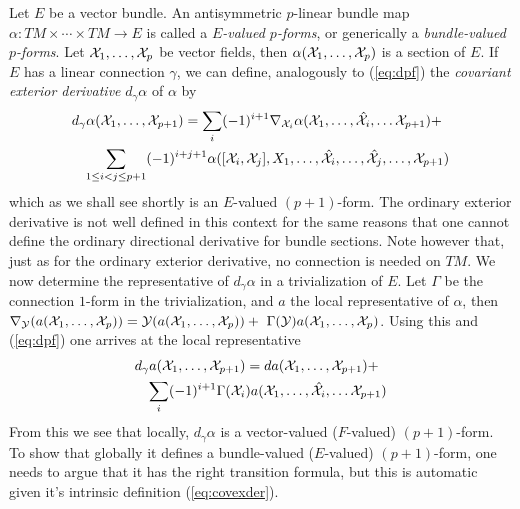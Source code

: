 \documentclass[12pt,titlepage]{article}
\def\cX{{\cal X}}
\def\cY{{\cal Y}}
\begin{document}
Let \(E\) be a vector bundle.  
An antisymmetric
\(p\)-linear bundle map \linebreak \(\alpha: TM \times \cdots \times TM\to
E\) is  called a {\em \(E\)-valued \(p\)-forms\/},
%
 or generically a
 {\em bundle-valued \(p\)-forms}.
%
Let \(\cX_1, \dots , \cX_p\) be vector fields, then 
\(\alpha(\cX_1, \dots , \cX_p)\) is a section of \(E\). 
If \(E\) has a linear connection \(\gamma\), we can define,
analogously to (\ref{eq:dpf}) the {\em covariant exterior derivative\/}
% 
\(d_\gamma \alpha\) of \(\alpha\) by
\begin{eqnarray}\nonumber
\lefteqn{d_\gamma \alpha(\cX_1,\dots,\cX_{p+1}) = \sum_i(-1)^{i+1} 
\nabla_{\cX_i}\alpha(\cX_1,\dots,\hat \cX_i,\dots \cX_{p+1}) +} 
\\ \label{eq:covexder} 
& & \sum_{1\le i < j \le p+1}(-1)^{i+j+1}
\alpha([\cX_i,\cX_j],X_1,\dots,\hat \cX_i, \dots,
\hat\cX_j,\dots,\cX_{p+1})
\end{eqnarray}
which as we shall see shortly is an \(E\)-valued \((p+1)\)-form. 
The ordinary exterior derivative is not well defined in this context for
the same reasons that one cannot define the ordinary directional
derivative for bundle sections. Note however that, just as for the
ordinary exterior derivative, no connection is needed on \(TM\).
We now 
determine the representative of \(d_\gamma\alpha\) in a trivialization
of \(E\). Let \(\Gamma\) be the connection \(1\)-form in the
trivialization, and \(a\) the local representative of \(\alpha\), 
then \(\nabla_{\cY}(a(\cX_1, \dots , \cX_p)) =
\cY(a(\cX_1, \dots , \cX_p)) + \
\Gamma(\cY)a(\cX_1, \dots , \cX_p)\). Using this and (\ref{eq:dpf})
one arrives at the local representative
\begin{eqnarray*}
\lefteqn{d_\gamma a(\cX_1,\dots,\cX_{p+1}) = 
da(\cX_1,\dots,\cX_{p+1}) +} 
\\ 
& & \sum_i(-1)^{i+1} 
\Gamma(\cX_i)a(\cX_1,\dots,\hat \cX_i,\dots \cX_{p+1})
\end{eqnarray*}
From this we see that locally, \(d_\gamma\alpha\) is a vector-valued 
(\(F\)-valued) \((p+1)\)-form. To show that globally 
it defines a bundle-valued 
(\(E\)-valued) \((p+1)\)-form, one needs to argue that it has the right
transition formula, but this is automatic given it's intrinsic
definition (\ref{eq:covexder}). 
\end{document}
